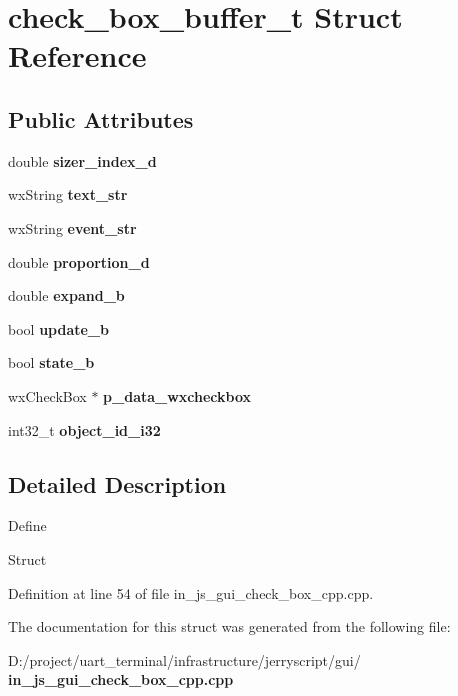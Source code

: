 \section{check\+\_\+box\+\_\+buffer\+\_\+t Struct Reference}
\label{structcheck__box__buffer__t}
\subsection*{Public Attributes}
\begin{DoxyCompactItemize}
\item 
\mbox{\label{structcheck__box__buffer__t_a94c9d04029f24db80fcc47c651860bcd}} 
double {\bfseries sizer\+\_\+index\+\_\+d}
\item 
\mbox{\label{structcheck__box__buffer__t_a09e467c905a6ea37e6f07b7af4203cf3}} 
wx\+String {\bfseries text\+\_\+str}
\item 
\mbox{\label{structcheck__box__buffer__t_a86edec4411e0d3411eb73d1215456ab8}} 
wx\+String {\bfseries event\+\_\+str}
\item 
\mbox{\label{structcheck__box__buffer__t_a55190f29e26b3b8cdba4e1da83c4dfc8}} 
double {\bfseries proportion\+\_\+d}
\item 
\mbox{\label{structcheck__box__buffer__t_a6ff880336a29484ac61468f0f6c3bdbf}} 
double {\bfseries expand\+\_\+b}
\item 
\mbox{\label{structcheck__box__buffer__t_a16d520cf4ba9789f687195036960605d}} 
bool {\bfseries update\+\_\+b}
\item 
\mbox{\label{structcheck__box__buffer__t_a49087c66d0dbaf93d79a82fe27da536b}} 
bool {\bfseries state\+\_\+b}
\item 
\mbox{\label{structcheck__box__buffer__t_a8d08fbd755127b1e5af81b97018b28aa}} 
wx\+Check\+Box $\ast$ {\bfseries p\+\_\+data\+\_\+wxcheckbox}
\item 
\mbox{\label{structcheck__box__buffer__t_a3faab56746905622e567d608b8ddd11a}} 
int32\+\_\+t {\bfseries object\+\_\+id\+\_\+i32}
\end{DoxyCompactItemize}


\subsection{Detailed Description}
Define

Struct 

Definition at line 54 of file in\+\_\+js\+\_\+gui\+\_\+check\+\_\+box\+\_\+cpp.\+cpp.



The documentation for this struct was generated from the following file\+:\begin{DoxyCompactItemize}
\item 
D\+:/project/uart\+\_\+terminal/infrastructure/jerryscript/gui/\textbf{ in\+\_\+js\+\_\+gui\+\_\+check\+\_\+box\+\_\+cpp.\+cpp}\end{DoxyCompactItemize}
